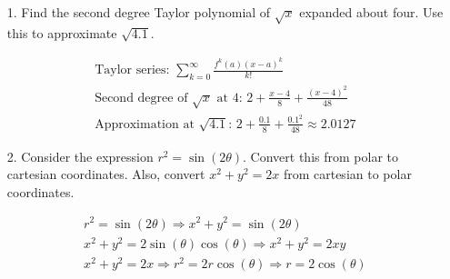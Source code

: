     \begin{itemize}
        \item [1.] Find the second degree Taylor polynomial of $\sqrt{x}$ expanded about four. Use this to approximate $\sqrt{4.1}$.
        \\
        \begin{mdframed}
            \begin{equation*}
                \begin{gathered}
                    \text{Taylor series: } \sum_{k=0}^{\infty}\frac{f^{k}(a)(x-a)^{k}}{k!}  \\
                    \text{Second degree of $\sqrt{x}$ at 4: } 
                    \boxed{2 + \frac{x-4}{8} + \frac{(x-4)^{2}}{48}}                        \\
                    \text{Approximation at $\sqrt{4.1}$: } 
                    2+\frac{0.1}{8}+\frac{0.1^{2}}{48} \approx \boxed{2.0127}
                \end{gathered}
            \end{equation*}
        \end{mdframed}

        \item [2.] Consider the expression $r^{2} = \sin(2\theta)$. Convert this from polar to cartesian coordinates. Also, convert $x^{2} + y^{2} = 2x$ from cartesian to polar coordinates.
        \\
        \begin{mdframed}
            \begin{equation*}
                \begin{gathered}
                    r^{2} = \sin(2\theta) \Rightarrow x^{2} + y^{2} = \sin(2\theta)                 \\
                    x^{2}+y^{2} = 2\sin(\theta)\cos(\theta) \Rightarrow \boxed{x^{2}+y^{2} = 2xy}   \\
                    x^{2}+y^{2} = 2x \Rightarrow r^{2} = 2r\cos(\theta) \Rightarrow \boxed{r = 2\cos(\theta)}
                \end{gathered}
            \end{equation*}
        \end{mdframed}


\end{itemize}
